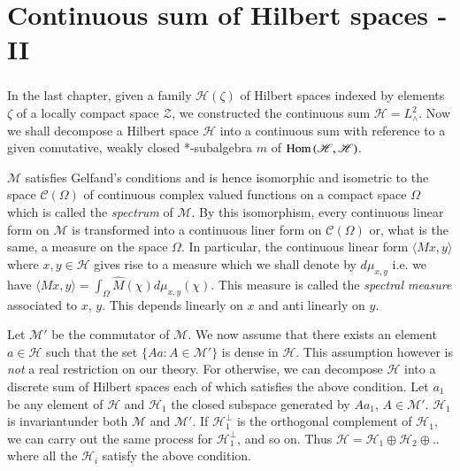 
\chapter{Continuous sum of Hilbert spaces - II}\label{PartIII-chap2}

\setcounter{section}{2}
\setcounter{subsection}{0}
\subsection{}\label{partIII-chap2-sec2.1}\pageoriginale

In the last chapter, given a family $\mathscr{H} (\zeta)$ of Hilbert
spaces 
indexed by elements $\zeta$ of a locally compact space $\mathcal{Z}$,
we constructed the continuous sum $\mathscr{H} = L^2_\wedge $. Now we
shall decompose a Hilbert space $\mathscr{H}$ into a continuous sum
with reference to a given comutative, weakly closed 
*-subalgebra $m$ of $\operatorname{Hom} \mathscr{(H,H)}$.

$\mathscr{M}$ satisfies Gelfand's conditions and is hence isomorphic and
isometric to the space $\mathscr{C} (\Omega)$ of continuous complex
valued functions on a compact space $\Omega$ which is called the
\textit{spectrum} of $\mathscr{M}$. By this isomorphism, every continuous linear
form on $\mathscr{M}$ is transformed into a continuous liner form on
$\mathscr{C}(\Omega)$ or, what is the same, a measure on the  
space $\Omega$. In particular, the continuous linear form $ \langle
Mx,y \rangle $ where $x,y \in \mathscr{H}$ gives rise to a measure
which we shall denote by $d \mu _{x,y}$ i.e. we have $\langle Mx,y
\rangle  = \int_\Omega \hat{M} (\chi) d \mu_{x,y}(\chi)$. This measure
is called the 
\textit{spectral measure} associated to $x$, $y$. This depends linearly
on $x$ and anti linearly on $y$.  

Let $\mathscr{M}'$ be the commutator of $\mathscr{M}$. We now assume
that there  exists an element  $a\in \mathscr{H}$ such that the set
$\{ Aa : A \in \mathscr{M}'\}$ is dense in $\mathscr{H}$. 
This assumption however is \textit{not} a real
restriction on our theory. For otherwise, we can decompose
$\mathscr{H}$ into a discrete sum of  Hilbert spaces each of which
satisfies the above 
condition. Let $a_1$ be any element of $\mathscr{H}$ and
$\mathscr{H}_1$ the closed subspace generated by $Aa_1$, $A \in
\mathscr{M}'$. $\mathscr{H}_1$ is invariant\pageoriginale under both
$\mathscr{M}$ and $\mathscr{M}'$. If 
$\mathscr{H}^{\perp}_{1}$ is the orthogonal complement of
$\mathscr{H}_1$, we can carry out the same process for
$\mathscr{H}^{\perp}_{1}$, and so on. Thus  
$\mathscr{H} = \mathscr{H}_1 \oplus \mathscr{H}_2 \oplus$.. where all
the $\mathscr{H}_i$ satisfy the above condition. 

